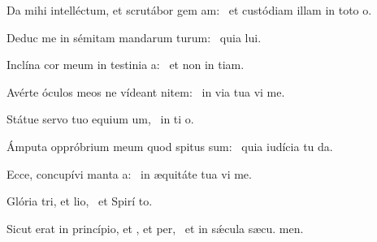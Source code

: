 

\vspace{-9mm}






\begin{psalm}
\begin{verses}
\item Da mihi intelléctum, et scrutábor gem am:~{\gstella} et custódiam illam in toto  o.
\item Deduc me in sémitam mandarum turum:~{\gstella} quia  lui.
\item Inclína cor meum in testinia a:~{\gstella} et non in tiam.
\item Avérte óculos meos ne vídeant nitem:~{\gstella} in via tua vi me.
\item Státue servo tuo equium um,~{\gstella} in ti o.
\item Ámputa oppróbrium meum quod spitus sum:~{\gstella} quia iudícia tu da.
\item Ecce, concupívi manta a:~{\gstella} in æquitáte tua vi me.
\item Glória tri, et lio,~{\gstella} et Spirí to.
\item Sicut erat in princípio, et , et per,~{\gstella} et in sǽcula sæcu. men.
\end{verses}
\end{psalm}

